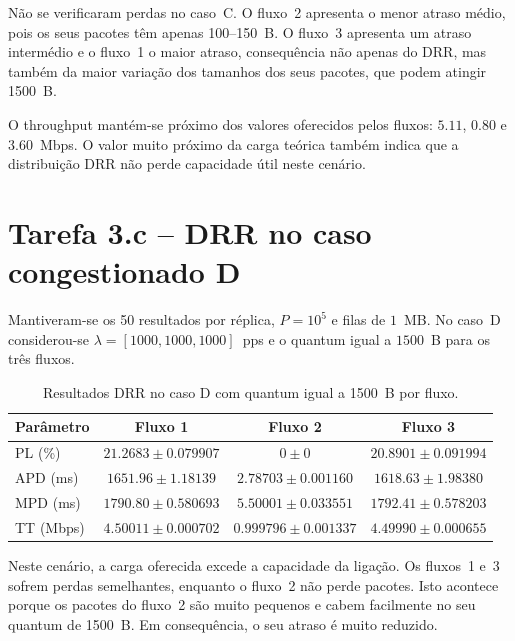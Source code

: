\documentclass[11pt,a4paper]{article}
\begin{document}
Não se verificaram perdas no caso~C. O fluxo~2 apresenta o menor atraso médio,
pois os seus pacotes têm apenas 100--150~B. O fluxo~3 apresenta um atraso
intermédio e o fluxo~1 o maior atraso, consequência não apenas do
DRR, mas também da maior variação dos tamanhos dos seus pacotes, que podem
atingir 1500~B.

O throughput mantém-se próximo dos valores oferecidos pelos fluxos:
$5.11$, $0.80$ e $3.60$~Mbps. O valor muito próximo da carga teórica também
indica que a distribuição DRR não perde capacidade útil neste cenário.

\section{Tarefa 3.c -- DRR no caso congestionado D}

Mantiveram-se os 50 resultados por réplica, $P=10^5$ e filas de $1$~MB.
No caso~D considerou-se
$\lambda=[1000,1000,1000]$~pps e o quantum igual a $1500$~B para os três
fluxos.

\begin{table}[htbp]
    \centering
    \caption{Resultados DRR no caso D com quantum igual a 1500~B por fluxo.}
    \label{tab:3c}
    \begin{tabular}{lccc}
        \toprule
        Parâmetro & Fluxo 1 & Fluxo 2 & Fluxo 3 \\
        \midrule
        PL (\%) & $21.2683 \pm 0.079907$ &
                  $0 \pm 0$ &
                  $20.8901 \pm 0.091994$ \\
        APD (ms) & $1651.96 \pm 1.18139$ &
                   $2.78703 \pm 0.001160$ &
                   $1618.63 \pm 1.98380$ \\
        MPD (ms) & $1790.80 \pm 0.580693$ &
                   $5.50001 \pm 0.033551$ &
                   $1792.41 \pm 0.578203$ \\
        TT (Mbps) & $4.50011 \pm 0.000702$ &
                    $0.999796 \pm 0.001337$ &
                    $4.49990 \pm 0.000655$ \\
        \bottomrule
    \end{tabular}
\end{table}

Neste cenário, a carga oferecida excede a capacidade da ligação. Os fluxos~1
e~3 sofrem perdas semelhantes, enquanto o fluxo~2 não perde pacotes. Isto
acontece porque os pacotes do fluxo~2 são muito pequenos e cabem facilmente
no seu quantum de 1500~B. Em consequência, o seu atraso é muito reduzido.
\end{document}

